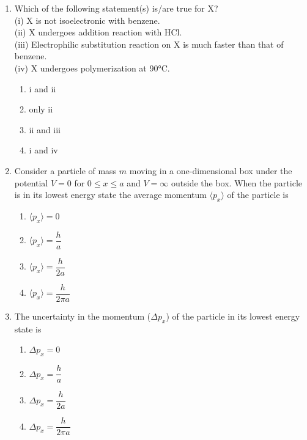 \documentclass[journal,12pt,onecolumn]{IEEEtran}
\theoremstyle{remark}
\begin{document}
\begin{enumerate}
\item  Which of the following statement(s) is/are true for X?\hfill{}\\
(i) X is not isoelectronic with benzene.\\
(ii) X undergoes addition reaction with HCl.\\
(iii) Electrophilic substitution reaction on X is much faster than that of benzene.\\
(iv) X undergoes polymerization at 90°C. \hfill{}
\begin{multicols}{2}
\begin{enumerate} 
    \item i and ii
    \item only ii
    \item ii and iii
    \item i and iv
\end{enumerate}
\end{multicols}


\item  Consider a particle of mass $m$ moving in a one-dimensional box under the potential $V=0$ for $0 \le x \le a$ and $V = \infty$ outside the box. When the particle is in its lowest energy state the average momentum $\langle p_x \rangle$ of the particle is \hfill{}
\begin{multicols}{2}
\begin{enumerate} 
    \item $\langle p_x \rangle = 0$
    \item $\langle p_x \rangle = \dfrac{h}{a}$
    \item $\langle p_x \rangle = \dfrac{h}{2a}$
    \item $\langle p_x \rangle = \dfrac{h}{2\pi a}$
\end{enumerate}
\end{multicols}


\item  The uncertainty in the momentum ($\Delta p_x$) of the particle in its lowest energy state is \hfill{}
\begin{multicols}{2}
\begin{enumerate} 
    \item $\Delta p_x = 0$
    \item $\Delta p_x = \dfrac{h}{a}$
    \item $\Delta p_x = \dfrac{h}{2a}$
    \item $\Delta p_x = \dfrac{h}{2\pi a}$
\end{enumerate}
\end{multicols}




\end{enumerate}
\end{document}
